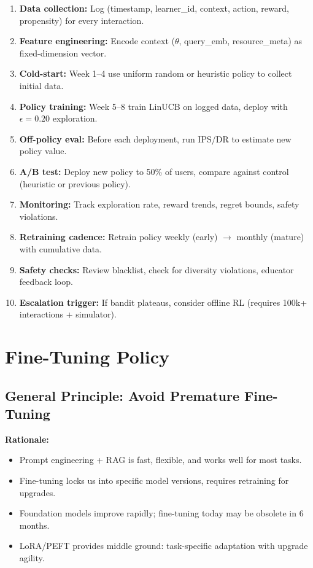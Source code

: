 \documentclass[11pt,letterpaper]{article}
\begin{document}
\begin{enumerate}
\item \textbf{Data collection:} Log (timestamp, learner\_id, context, action, reward, propensity) for every interaction.
\item \textbf{Feature engineering:} Encode context ($\theta$, query\_emb, resource\_meta) as fixed-dimension vector.
\item \textbf{Cold-start:} Week 1--4 use uniform random or heuristic policy to collect initial data.
\item \textbf{Policy training:} Week 5--8 train LinUCB on logged data, deploy with $\epsilon = 0.20$ exploration.
\item \textbf{Off-policy eval:} Before each deployment, run IPS/DR to estimate new policy value.
\item \textbf{A/B test:} Deploy new policy to 50\% of users, compare against control (heuristic or previous policy).
\item \textbf{Monitoring:} Track exploration rate, reward trends, regret bounds, safety violations.
\item \textbf{Retraining cadence:} Retrain policy weekly (early) $\rightarrow$ monthly (mature) with cumulative data.
\item \textbf{Safety checks:} Review blacklist, check for diversity violations, educator feedback loop.
\item \textbf{Escalation trigger:} If bandit plateaus, consider offline RL (requires 100k+ interactions + simulator).
\end{enumerate}

\newpage

\section{Fine-Tuning Policy}\label{sec:fine-tuning-policy}

\subsection{General Principle: Avoid Premature Fine-Tuning}\label{subsec:avoid-premature-finetuning}

\textbf{Rationale:}
\begin{itemize}
\item Prompt engineering + RAG is fast, flexible, and works well for most tasks.
\item Fine-tuning locks us into specific model versions, requires retraining for upgrades.
\item Foundation models improve rapidly; fine-tuning today may be obsolete in 6 months.
\item LoRA/PEFT provides middle ground: task-specific adaptation with upgrade agility.
\end{itemize}
\end{document}

